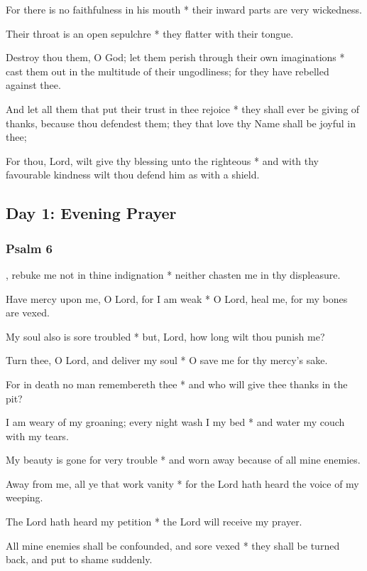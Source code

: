 For there is no faithfulness in his mouth * their inward parts are very wickedness.

Their throat is an open sepulchre * they flatter with their tongue.

Destroy thou them, O God; let them perish through their own imaginations * cast them out in the multitude of their ungodliness; for they have rebelled against thee.

And let all them that put their trust in thee rejoice * they shall ever be giving of thanks, because thou defendest them; they that love thy Name shall be joyful in thee;

For thou, Lord, wilt give thy blessing unto the righteous * and with thy favourable kindness wilt thou defend him as with a shield.

\subsection{Day 1: Evening Prayer}

\subsubsection{Psalm 6}


, rebuke me not in thine indignation * neither chasten me in thy displeasure.

Have mercy upon me, O Lord, for I am weak * O Lord, heal me, for my bones are vexed.

My soul also is sore troubled * but, Lord, how long wilt thou punish me?

Turn thee, O Lord, and deliver my soul * O save me for thy mercy's sake.

For in death no man remembereth thee * and who will give thee thanks in the pit?

I am weary of my groaning; every night wash I my bed * and water my couch with my tears.

My beauty is gone for very trouble * and worn away because of all mine enemies.

Away from me, all ye that work vanity * for the Lord hath heard the voice of my weeping.

The Lord hath heard my petition * the Lord will receive my prayer.

All mine enemies shall be confounded, and sore vexed * they shall be turned back, and put to shame suddenly.

